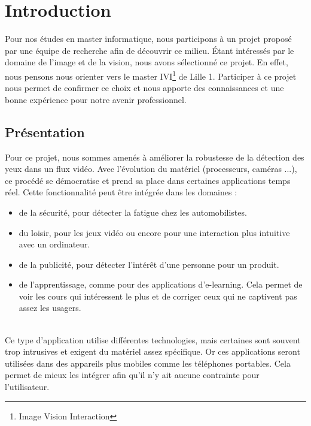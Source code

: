 \section{Introduction}

Pour nos études en master informatique, nous participons à un projet proposé par une 
équipe de recherche afin de découvrir ce milieu. 
Étant intéressés par le domaine de l'image et de la vision, nous avons sélectionné ce projet. 
En effet, nous pensons nous orienter vers le master IVI\footnote{Image Vision Interaction} de 
Lille 1. Participer à ce projet nous permet de confirmer ce choix et nous apporte des 
connaissances et une bonne expérience pour notre avenir professionnel.

\subsection{Présentation}
Pour ce projet, nous sommes amenés à améliorer la robustesse de la détection des yeux dans un flux vidéo.
Avec l'évolution du matériel (processeurs, caméras ...), ce procédé se démocratise et prend sa place 
dans certaines applications temps réel. Cette fonctionnalité peut être intégrée dans les domaines : 
\begin{itemize}
 \item de la sécurité, pour détecter la fatigue chez les automobilistes.
 \item du loisir, pour les jeux vidéo ou encore pour une interaction plus intuitive avec un ordinateur.
 \item de la publicité, pour détecter l'intérêt d'une personne pour un produit. 
 \item de l'apprentissage, comme pour des applications d'e-learning. Cela permet de voir les cours
 qui intéressent le plus et de corriger ceux qui ne captivent pas assez les usagers.
\end{itemize}
\ \\
Ce type d'application utilise différentes technologies, mais certaines sont souvent trop intrusives 
et exigent du matériel assez spécifique. Or ces applications seront utilisées dans des appareils plus mobiles
comme les téléphones portables. Cela permet de mieux les intégrer afin qu'il n'y ait aucune contrainte pour l'utilisateur.


